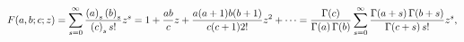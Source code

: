 \[\mathop{F\/}\nolimits\!\left(a,b;c;z\right)=\sum_{s=0}^{\infty}\frac{\left(a%
\right)_{s}\left(b\right)_{s}}{\left(c\right)_{s}s!}z^{s}=1+\frac{ab}{c}z+%
\frac{a(a+1)b(b+1)}{c(c+1)2!}z^{2}+\cdots=\frac{\mathop{\Gamma\/}\nolimits\!%
\left(c\right)}{\mathop{\Gamma\/}\nolimits\!\left(a\right)\mathop{\Gamma\/}%
\nolimits\!\left(b\right)}\sum_{s=0}^{\infty}\frac{\mathop{\Gamma\/}\nolimits%
\!\left(a+s\right)\mathop{\Gamma\/}\nolimits\!\left(b+s\right)}{\mathop{\Gamma%
\/}\nolimits\!\left(c+s\right)s!}z^{s},\]